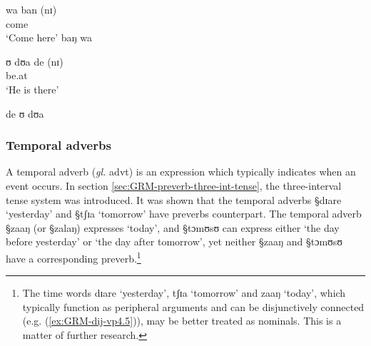 \begin{exe}
\ex\label{ex:vp}
\begin{xlist}

\ex\label{ex:deic-adv-prox}
\gll wa ban (nɪ)\\
     come {\advl} {\postp} \\
\glt  `Come here'
\ex\label{ex:deic-adv-prox-out}
\textasteriskcentered baŋ wa 

 \ex\label{ex:deic-adv-dist}
\gll ʊ  dʊa de (nɪ) \\
       {\psg}  be.at  {\advl}  {\postp}\\
\glt  `He is there'

\ex\label{ex:deic-adv-dist-out}
\textasteriskcentered de ʊ  dʊa 
\end{xlist}
\end{exe}



\subsubsection{Temporal adverbs}
\label{sec:GRM-manner-adv}

A temporal adverb  ({\it gl.} {\sc advt}) is an expression which typically 
indicates when  an event occurs. In section
\ref{sec:GRM-preverb-three-int-tense}, the three-interval tense system was
introduced. It was shown that the temporal adverbs {\S  dɪare} `yesterday' and
{\S tʃɪa} `tomorrow'  have preverbs counterpart. The  temporal
adverb  {\S zaaŋ} (or {\S zalaŋ}) expresses `today',  and   {\S tɔmʊsʊ} can
express either  `the day before yesterday' or  `the day after tomorrow',   yet 
neither {\S zaaŋ} and {\S tɔmʊsʊ}   have a corresponding
preverb.\footnote{The time words {\F  dɪare} `yesterday',  {\F tʃɪa}
`tomorrow'  and  {\F zaaŋ} `today', which  typically function as peripheral
arguments and can be disjunctively connected (e.g. (\ref{ex:GRM-dij-vp4.5})),  
may be better treated as nominals. This is a matter of further research.}


